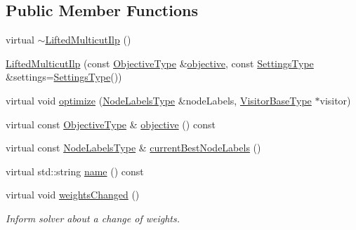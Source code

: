 \subsection*{Public Member Functions}
\begin{DoxyCompactItemize}
\item 
virtual \hyperlink{classnifty_1_1graph_1_1opt_1_1lifted__multicut_1_1LiftedMulticutIlp_a2f930d2a10b27e585a4a0e75bde355d5}{$\sim$\+Lifted\+Multicut\+Ilp} ()
\item 
\hyperlink{classnifty_1_1graph_1_1opt_1_1lifted__multicut_1_1LiftedMulticutIlp_adf214ea81d4a8f0af55aa34b7ae48fb6}{Lifted\+Multicut\+Ilp} (const \hyperlink{classnifty_1_1graph_1_1opt_1_1lifted__multicut_1_1LiftedMulticutIlp_a4c1ed011eb6ea9ec5845249bc94869c8}{Objective\+Type} \&\hyperlink{classnifty_1_1graph_1_1opt_1_1lifted__multicut_1_1LiftedMulticutIlp_ab8d9679a9568dd6f0838bea4c4ed14ac}{objective}, const \hyperlink{structnifty_1_1graph_1_1opt_1_1lifted__multicut_1_1LiftedMulticutIlp_1_1SettingsType}{Settings\+Type} \&settings=\hyperlink{structnifty_1_1graph_1_1opt_1_1lifted__multicut_1_1LiftedMulticutIlp_1_1SettingsType}{Settings\+Type}())
\item 
virtual void \hyperlink{classnifty_1_1graph_1_1opt_1_1lifted__multicut_1_1LiftedMulticutIlp_a688693c86bce98f025a257b656044079}{optimize} (\hyperlink{classnifty_1_1graph_1_1opt_1_1lifted__multicut_1_1LiftedMulticutIlp_a05df928d48fd5cd43241c999314aa92f}{Node\+Labels\+Type} \&node\+Labels, \hyperlink{classnifty_1_1graph_1_1opt_1_1lifted__multicut_1_1LiftedMulticutIlp_a6ac1e4783a7442ae1ff633dd5f008804}{Visitor\+Base\+Type} $\ast$visitor)
\item 
virtual const \hyperlink{classnifty_1_1graph_1_1opt_1_1lifted__multicut_1_1LiftedMulticutIlp_a4c1ed011eb6ea9ec5845249bc94869c8}{Objective\+Type} \& \hyperlink{classnifty_1_1graph_1_1opt_1_1lifted__multicut_1_1LiftedMulticutIlp_ab8d9679a9568dd6f0838bea4c4ed14ac}{objective} () const
\item 
virtual const \hyperlink{classnifty_1_1graph_1_1opt_1_1lifted__multicut_1_1LiftedMulticutIlp_a05df928d48fd5cd43241c999314aa92f}{Node\+Labels\+Type} \& \hyperlink{classnifty_1_1graph_1_1opt_1_1lifted__multicut_1_1LiftedMulticutIlp_a43a6e3211e79a7e95e8f063247372812}{current\+Best\+Node\+Labels} ()
\item 
virtual std\+::string \hyperlink{classnifty_1_1graph_1_1opt_1_1lifted__multicut_1_1LiftedMulticutIlp_aea508a0c1233c7e391e9dfbb16fee43e}{name} () const
\item 
virtual void \hyperlink{classnifty_1_1graph_1_1opt_1_1lifted__multicut_1_1LiftedMulticutIlp_a3d487db0bd9410f25dd800d04a6633e8}{weights\+Changed} ()
\begin{DoxyCompactList}\small\item\em Inform solver about a change of weights. \end{DoxyCompactList}\end{DoxyCompactItemize}


